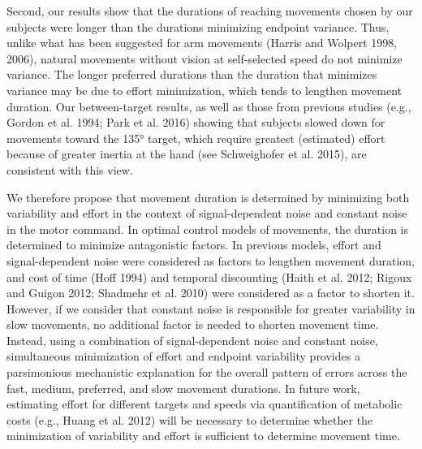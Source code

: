 Second, our results show that the durations of reaching movements chosen by our subjects were longer than the durations minimizing endpoint variance. Thus, unlike what has been suggested for arm movements (Harris and Wolpert 1998, 2006), natural movements without vision at self-selected speed do not minimize variance. The longer preferred durations than the duration that minimizes variance may be due to effort minimization, which tends to lengthen movement duration. Our between-target results, as well as those from previous studies (e.g., Gordon et al. 1994; Park et al. 2016) showing that subjects slowed down for movements toward the \ang{135} target, which require greatest (estimated) effort because of greater inertia at the hand (see Schweighofer et al. 2015), are consistent with this view.

We therefore propose that movement duration is determined by minimizing both variability and effort in the context of signal-dependent noise and constant noise in the motor command. In optimal control models of movements, the duration is determined to minimize antagonistic factors. In previous models, effort and signal-dependent noise were considered as factors to lengthen movement duration, and cost of time (Hoff 1994) and temporal discounting (Haith et al. 2012; Rigoux and Guigon 2012; Shadmehr et al. 2010) were considered as a factor to shorten it. However, if we consider that constant noise is responsible for greater variability in slow movements, no additional factor is needed to shorten movement time. Instead, using a combination of signal-dependent noise and constant noise, simultaneous minimization of effort and endpoint variability provides a parsimonious mechanistic explanation for the overall pattern of errors across the fast, medium, preferred, and slow movement durations. In future work, estimating effort for different targets and speeds via quantification of metabolic costs (e.g., Huang et al. 2012) will be necessary to determine whether the minimization of variability and effort is sufficient to determine movement time.

